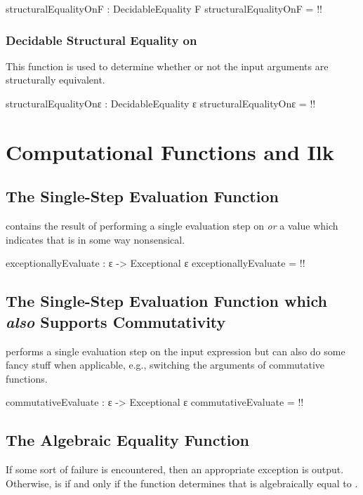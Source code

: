\documentclass{report}
\begin{document}
\begin{code}
structuralEqualityOnF : DecidableEquality F
structuralEqualityOnF = {!!}
\end{code}

\subsection{Decidable Structural Equality on }
This function is used to determine whether or not the input arguments are structurally equivalent.

\begin{code}
structuralEqualityOnε : DecidableEquality ε
structuralEqualityOnε = {!!}
\end{code}

\chapter{Computational Functions and Ilk}

\section{The Single-Step Evaluation Function}
  contains the result of performing a single evaluation step on  \emph{or} a value which indicates that  is in some way nonsensical.

\begin{code}
exceptionallyEvaluate : ε -> Exceptional ε
exceptionallyEvaluate = {!!}
\end{code}

\section{The Single-Step Evaluation Function which \emph{also} Supports Commutativity}
  performs a single evaluation step on the input expression but can also do some fancy stuff when applicable, e.g., switching the arguments of commutative functions.

\begin{code}
commutativeEvaluate : ε -> Exceptional ε
commutativeEvaluate = {!!}
\end{code}

\section{The Algebraic Equality Function}
If some sort of failure is encountered, then an appropriate exception is output.  Otherwise,    is   if and only if the function determines that  is algebraically equal to .
\end{document}
